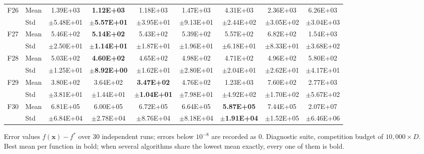 \begin{table}[htbp]
{\begin{tabular}{clccccccc}
F26 & Mean & 1.39E+03 & \textbf{1.12E+03} & 1.18E+03 & 1.47E+03 & 4.31E+03 & 2.36E+03 & 6.26E+03 \\
 & Std & $\pm$5.48E+01 & $\pm$\textbf{5.57E+01} & $\pm$3.95E+01 & $\pm$9.13E+01 & $\pm$2.44E+02 & $\pm$3.05E+02 & $\pm$3.04E+03 \\
F27 & Mean & 5.46E+02 & \textbf{5.14E+02} & 5.43E+02 & 5.39E+02 & 5.57E+02 & 6.82E+02 & 1.54E+03 \\
 & Std & $\pm$2.50E+01 & $\pm$\textbf{1.14E+01} & $\pm$1.87E+01 & $\pm$1.96E+01 & $\pm$6.18E+01 & $\pm$8.33E+01 & $\pm$3.68E+02 \\
F28 & Mean & 5.03E+02 & \textbf{4.60E+02} & 4.65E+02 & 4.98E+02 & 4.71E+02 & 4.96E+02 & 5.80E+02 \\
 & Std & $\pm$1.25E+01 & $\pm$\textbf{8.92E+00} & $\pm$1.62E+01 & $\pm$2.80E+01 & $\pm$2.04E+01 & $\pm$2.62E+01 & $\pm$4.17E+01 \\
F29 & Mean & 3.80E+02 & 3.64E+02 & \textbf{3.47E+02} & 4.76E+02 & 1.23E+03 & 7.60E+02 & 2.77E+03 \\
 & Std & $\pm$3.81E+01 & $\pm$1.44E+01 & $\pm$\textbf{1.04E+01} & $\pm$7.98E+01 & $\pm$4.92E+02 & $\pm$1.70E+02 & $\pm$5.67E+02 \\
F30 & Mean & 6.81E+05 & 6.00E+05 & 6.72E+05 & 6.64E+05 & \textbf{5.87E+05} & 7.44E+05 & 2.07E+07 \\
 & Std & $\pm$6.84E+04 & $\pm$2.78E+04 & $\pm$8.76E+04 & $\pm$8.18E+04 & $\pm$\textbf{1.91E+04} & $\pm$1.52E+05 & $\pm$6.46E+06 \\
\bottomrule
\end{tabular}}
\begin{flushleft}\footnotesize
Error values $f(\mathbf{x})-f^{*}$ over 30 independent runs; errors below $10^{-8}$ are recorded as 0. Diagnostic suite, competition budget of $10{,}000\times D$. Best mean per function in bold; when several algorithms share the lowest mean exactly, every one of them is bold.
\end{flushleft}
\end{table}
